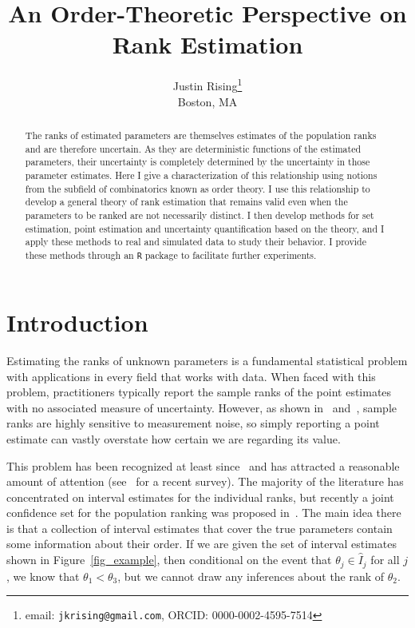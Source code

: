 \documentclass[12pt]{article}
\numberwithin{theorem}{section}
\begin{document}
\title{An Order-Theoretic Perspective on Rank Estimation}
\author{Justin Rising\thanks{email: \texttt{jkrising@gmail.com}, ORCID: 0000-0002-4595-7514}\\Boston, MA}
\maketitle

\begin{abstract}
The ranks of estimated parameters are themselves estimates of the population ranks and are therefore uncertain.  As they are deterministic functions of the estimated parameters, their uncertainty is completely determined by the uncertainty in those parameter estimates.  Here I give a characterization of this relationship using notions from the subfield of combinatorics known as order theory.  I use this relationship to develop a general theory of rank estimation that remains valid even when the parameters to be ranked are not necessarily distinct.  I then develop methods for set estimation, point estimation and uncertainty quantification based on the theory, and I apply these methods to real and simulated data to study their behavior.  I provide these methods through an \texttt{R} package to facilitate further experiments.
\end{abstract}

\section{Introduction}
\label{sec_intro}

Estimating the ranks of unknown parameters is a fundamental statistical problem with applications in every field that works with data.  When faced with this problem, practitioners typically report the sample ranks of the point estimates with no associated measure of uncertainty.  However, as shown in~\cite{hall2010variability} and~\cite{zuk2007uncertainty}, sample ranks are highly sensitive to measurement noise, so simply reporting a point estimate can vastly overstate how certain we are regarding its value.

This problem has been recognized at least since~\cite{goldstein1996tables} and has attracted a reasonable amount of attention (see~\cite{almohamad2022rankCIs} for a recent survey).  The majority of the literature has concentrated on interval estimates for the individual ranks, but recently a joint confidence set for the population ranking was proposed in~\cite{klein2020jointCR}.  The main idea there is that a collection of interval estimates that cover the true parameters contain some information about their order.  If we are given the set of interval estimates shown in Figure~\ref{fig_example}, then conditional on the event that $\theta_j \in \hat{I}_j$ for all $j$, we know that $\theta_1 < \theta_3$, but we cannot draw any inferences about the rank of $\theta_2$.
\end{document}
